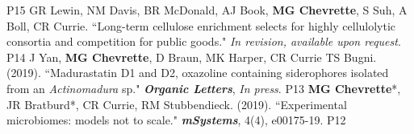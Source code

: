 \begin{cvpubs}
{    } %
    {P15} %
  \cvpub
    {GR Lewin, NM Davis, BR McDonald, AJ Book, \textbf{MG Chevrette}, S Suh, A Boll, CR Currie. ``Long-term cellulose enrichment selects for highly cellulolytic consortia and competition for public goods." \textit{In revision, available upon request}.
    } %
    {P14} %
   \cvpub
    {J Yan, \textbf{MG Chevrette}, D Braun, MK Harper, CR Currie TS Bugni. (2019). ``Madurastatin D1 and D2, oxazoline containing siderophores isolated from an \textit{Actinomadura} sp." \textit{\textbf{Organic Letters}}, \textit{In press}. \textbf{\textit{}}
    } %
    {P13}
  \cvpub
    {\textbf{MG Chevrette}*, JR Bratburd*, CR Currie, RM Stubbendieck. (2019). ``Experimental microbiomes: models not to scale." \textit{\textbf{mSystems}}, 4(4), e00175-19. \textbf{\textit{}}
    } %
    {P12} %
\end{cvpubs}
